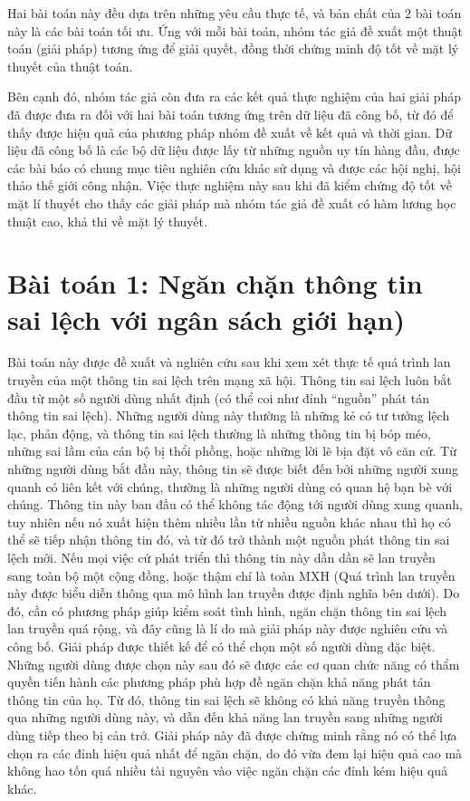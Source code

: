 Hai bài toán này đều dựa trên những yêu cầu thực tế, và bản chất của 2 bài toán này là các bài toán tối ưu. Ứng với mỗi bài toán, nhóm tác giả đề xuất một thuật toán (giải pháp) tương ứng để giải quyết, đồng thời chứng minh độ tốt về mặt lý thuyết của thuật toán.

Bên cạnh đó, nhóm tác giả còn đưa ra các kết quả thực nghiệm của hai giải pháp đã được đưa ra đối với hai bài toán tương ứng trên dữ liệu đã công bố, từ đó để thấy được hiệu quả của phương pháp nhóm đề xuất về kết quả và thời gian. Dữ liệu đã công bố là các bộ dữ liệu được lấy từ những nguồn uy tín hàng đầu, được các bài báo có chung mục tiêu nghiên cứu khác sử dụng và được các hội nghị, hội thảo thế giới công nhận. Việc thực nghiệm này sau khi đã kiểm chứng độ tốt về mặt lí thuyết cho thấy các giải pháp mà nhóm tác giả đề xuất có hàm lương học thuật cao, khả thi về mặt lý thuyết.

\section{Bài toán 1: Ngăn chặn thông tin sai lệch với ngân sách giới hạn)}
Bài toán này được đề xuất và nghiên cứu sau khi xem xét thực tế quá trình lan truyền của một thông tin sai lệch trên mạng xã hội. Thông tin sai lệch luôn bắt đầu từ một số người dùng nhất định (có thể coi như đỉnh “nguồn” phát tán thông tin sai lệch). Những người dùng này thường là những kẻ có tư tưởng lệch lạc, phản động, và thông tin sai lệch thường là những thông tin bị bóp méo, những sai lầm của cán bộ bị thổi phồng, hoặc những lời lẽ bịa đặt vô căn cứ. Từ những người dùng bắt đầu này, thông tin sẽ được biết đến bởi những người xung quanh có liên kết với chúng, thường là những người dùng có quan hệ bạn bè với chúng. Thông tin này ban đầu có thể không tác động tới người dùng xung quanh, tuy nhiên nếu nó xuất hiện thêm nhiều lần từ nhiều nguồn khác nhau thì họ có thể sẽ tiếp nhận thông tin đó, và từ đó trở thành một nguồn phát thông tin sai lệch mới. Nếu mọi việc cứ phát triển thì thông tin này dần dần sẽ lan truyền sang toàn bộ một cộng đồng, hoặc thậm chí là toàn MXH (Quá trình lan truyền này được biểu diễn thông qua mô hình lan truyền được định nghĩa bên dưới). Do đó, cần có phương pháp giúp kiểm soát tình hình, ngăn chặn thông tin sai lệch lan truyền quá rộng, và đây cũng là lí do mà giải pháp này được nghiên cứu và công bố. Giải pháp được thiết kế để có thể chọn một số người dùng đặc biệt. Những người dùng được chọn này sau đó sẽ được các cơ quan chức năng có thẩm quyền tiến hành các phương pháp phù hợp đề ngăn chặn khả năng phát tán thông tin của họ. Từ đó, thông tin sai lệch sẽ không có khả năng truyền thông qua những người dùng này, và dẫn đến khả năng lan truyền sang những người dùng tiếp theo bị cản trở. Giải pháp này đã được chứng minh rằng nó có thể lựa chọn ra các đỉnh hiệu quả nhất để ngăn chặn, do đó vừa đem lại hiệu quả cao mà không hao tốn quá nhiều tài nguyên vào việc ngăn chặn các đỉnh kém hiệu quả khác.
